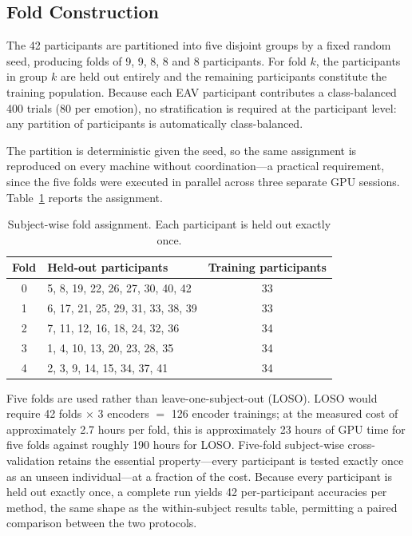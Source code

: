 \subsection{Fold Construction}

The 42 participants are partitioned into five disjoint groups by a fixed random seed,
producing folds of 9, 9, 8, 8 and 8 participants. For fold $k$, the participants in
group $k$ are held out entirely and the remaining participants constitute the
training population. Because each EAV participant contributes a class-balanced 400
trials (80 per emotion), no stratification is required at the participant level: any
partition of participants is automatically class-balanced.

The partition is deterministic given the seed, so the same assignment is reproduced on
every machine without coordination---a practical requirement, since the five folds
were executed in parallel across three separate GPU sessions. Table~\ref{tab:cs_folds}
reports the assignment.

\begin{table}[htbp]
\centering
\caption{Subject-wise fold assignment. Each participant is held out exactly once.}
\label{tab:cs_folds}
\begin{tabular}{clc}
\hline
\textbf{Fold} & \textbf{Held-out participants} & \textbf{Training participants} \\
\hline
0 & 5, 8, 19, 22, 26, 27, 30, 40, 42 & 33 \\
1 & 6, 17, 21, 25, 29, 31, 33, 38, 39 & 33 \\
2 & 7, 11, 12, 16, 18, 24, 32, 36 & 34 \\
3 & 1, 4, 10, 13, 20, 23, 28, 35 & 34 \\
4 & 2, 3, 9, 14, 15, 34, 37, 41 & 34 \\
\hline
\end{tabular}
\end{table}

Five folds are used rather than leave-one-subject-out (LOSO). LOSO would require 42
folds $\times$ 3 encoders $=$ 126 encoder trainings; at the measured cost of
approximately 2.7 hours per fold, this is approximately 23 hours of GPU time for
five folds against roughly 190 hours for LOSO. Five-fold subject-wise
cross-validation retains the essential property---every participant is tested exactly
once as an unseen individual---at a fraction of the cost. Because every participant is
held out exactly once, a complete run yields 42 per-participant accuracies per method,
the same shape as the within-subject results table, permitting a paired comparison
between the two protocols.

